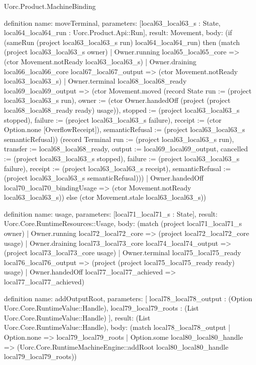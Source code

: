 \begin{lexlean}{Uorc.Product.MachineBinding}
\begin{semanticmodule}
definition{
  name: moveTerminal,
  parameters: [local63_local63_s : State, local64_local64_run : Uorc.Product.Api::Run],
  result: Movement,
  body: (if (sameRun (project local63_local63_s run) local64_local64_run) then (match (project local63_local63_s owner)
    | Owner.running local65_local65_core => (ctor Movement.notReady local63_local63_s)
    | Owner.draining local66_local66_core local67_local67_output => (ctor Movement.notReady local63_local63_s)
    | Owner.terminal local68_local68_ready local69_local69_output => (ctor Movement.moved (record State {run := (project local63_local63_s run), owner := (ctor Owner.handedOff (project (project local68_local68_ready ready) usage)), stopped := (project local63_local63_s stopped), failure := (project local63_local63_s failure), receipt := (ctor Option.none [OverflowReceipt]), semanticRefusal := (project local63_local63_s semanticRefusal)}) (record Terminal {run := (project local63_local63_s run), transfer := local68_local68_ready, output := local69_local69_output, cancelled := (project local63_local63_s stopped), failure := (project local63_local63_s failure), receipt := (project local63_local63_s receipt), semanticRefusal := (project local63_local63_s semanticRefusal)}))
    | Owner.handedOff local70_local70_bindingUsage => (ctor Movement.notReady local63_local63_s)) else (ctor Movement.stale local63_local63_s))
}

definition{
  name: usage,
  parameters: [local71_local71_s : State],
  result: Uorc.Core.RuntimeResources::Usage,
  body: (match (project local71_local71_s owner)
    | Owner.running local72_local72_core => (project local72_local72_core usage)
    | Owner.draining local73_local73_core local74_local74_output => (project local73_local73_core usage)
    | Owner.terminal local75_local75_ready local76_local76_output => (project (project local75_local75_ready ready) usage)
    | Owner.handedOff local77_local77_achieved => local77_local77_achieved)
}

definition{
  name: addOutputRoot,
  parameters: [
    local78_local78_output : (Option Uorc.Core.RuntimeValue::Handle),
    local79_local79_roots : (List Uorc.Core.RuntimeValue::Handle)
  ],
  result: (List Uorc.Core.RuntimeValue::Handle),
  body: (match local78_local78_output
    | Option.none => local79_local79_roots
    | Option.some local80_local80_handle => (Uorc.Core.RuntimeMachineEngine::addRoot local80_local80_handle local79_local79_roots))
}


\end{semanticmodule}
\end{lexlean}
